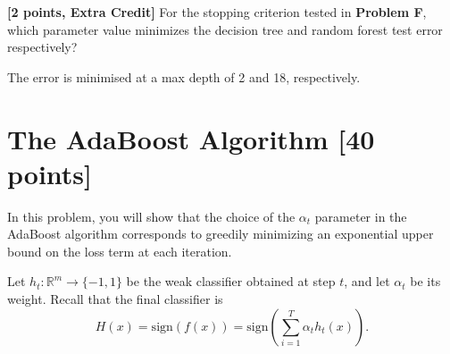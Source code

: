 \begin{solution}
    \begin{figure}[H]
      \end{figure}
\end{solution}

\problem\textbf{[2 points, Extra Credit] }For the stopping criterion tested in \textbf{Problem F}, which parameter value minimizes the decision tree and random forest test error respectively? 

\begin{solution}
   The error is minimised at a max depth of 2 and 18, respectively.
\end{solution}



\newpage
\section{The AdaBoost Algorithm [40 points]}

In this problem, you will show that the choice of the $\alpha_t$ parameter in
the AdaBoost algorithm corresponds to greedily minimizing an exponential upper
bound on the loss term at each iteration.

\problem[3]
Let $h_t: \mathbb{R}^m \rightarrow \{-1,1\}$ be the weak classifier obtained at step $t$, and let $\alpha_t$ be
its weight. Recall that the final classifier is $$H(x) = \text{sign}(f(x)) = \text{sign} \left(\sum\limits_{i=1}^T \alpha_{t}h_t(x) \right).$$

